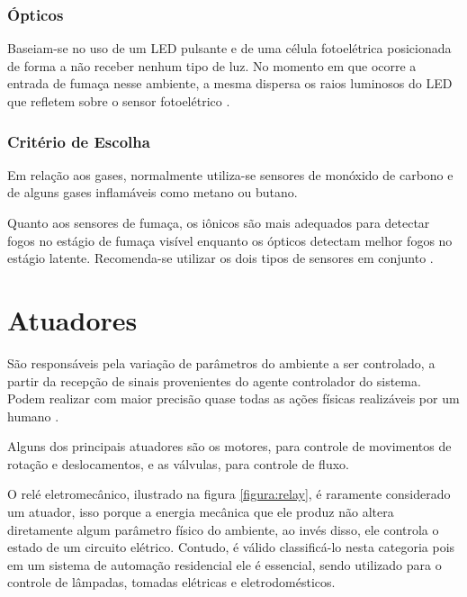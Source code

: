 \subsubsection{Ópticos}
Baseiam-se no uso de um LED pulsante e de uma célula fotoelétrica posicionada de forma a não receber nenhum
tipo de luz. No momento em que ocorre a entrada de fumaça nesse ambiente, a mesma dispersa os raios luminosos do
LED que refletem sobre o sensor fotoelétrico \cite{thomazini_albuquerque2005}.

\subsubsection{Critério de Escolha}
Em relação aos gases, normalmente utiliza-se sensores de monóxido de carbono e de alguns gases inflamáveis como
metano ou butano.

Quanto aos sensores de fumaça, os iônicos são mais adequados para detectar fogos no estágio de fumaça visível
enquanto os ópticos detectam melhor fogos no estágio latente. Recomenda-se utilizar os dois tipos de sensores
em conjunto \cite{sinclair2001}.

\section{Atuadores}
São responsáveis pela variação de parâmetros do ambiente a ser controlado, a partir da recepção de sinais
provenientes do agente controlador do sistema. Podem realizar com maior precisão quase todas as ações físicas
realizáveis por um humano \cite{kondrasovas2013}.

Alguns dos principais atuadores são os motores, para controle de movimentos de rotação e deslocamentos, e as
válvulas, para controle de fluxo.

O relé eletromecânico, ilustrado na figura \ref{figura:relay}, é raramente considerado um atuador, isso porque
a energia mecânica que ele produz não altera diretamente algum parâmetro físico do ambiente, ao invés disso,
ele controla o estado de um circuito elétrico. Contudo, é válido classificá-lo nesta categoria pois em um
sistema de automação residencial ele é essencial, sendo utilizado para o controle de lâmpadas, tomadas
elétricas e eletrodomésticos.

